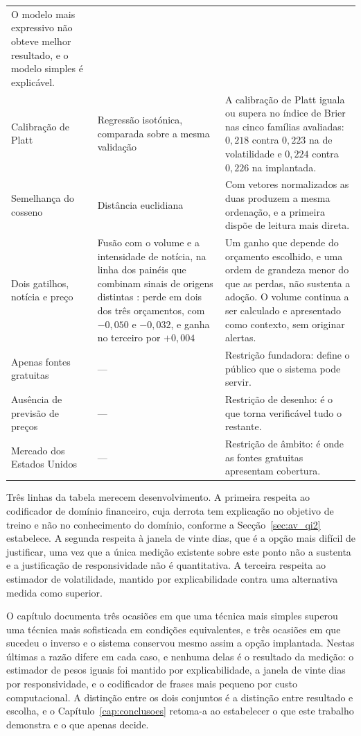 \begin{table}[!htbp]
\begin{tabular}{L{0.19\textwidth} L{0.30\textwidth} L{0.39\textwidth}}
O modelo mais expressivo não obteve melhor resultado, e o modelo simples é explicável. \\
\addlinespace
Calibração de Platt & Regressão isotónica, comparada sobre a mesma validação & A calibração de Platt
iguala ou supera no índice de Brier nas cinco famílias avaliadas: $0{,}218$ contra $0{,}223$ na de
volatilidade e $0{,}224$ contra $0{,}226$ na implantada. \\
\addlinespace
Semelhança do cosseno & Distância euclidiana & Com vetores normalizados as duas produzem a mesma
ordenação, e a primeira dispõe de leitura mais direta. \\
\addlinespace
Dois gatilhos, notícia e preço & Fusão com o volume e a intensidade de notícia, na linha dos painéis
que combinam sinais de origens distintas \autocite{worldmonitor2026}: perde em dois dos três
orçamentos, com $-0{,}050$ e $-0{,}032$, e ganha no terceiro por $+0{,}004$ & Um ganho que depende do
orçamento escolhido, e uma ordem de grandeza menor do que as perdas, não sustenta a adoção. O volume
continua a ser calculado e apresentado como contexto, sem originar alertas. \\
\midrule
Apenas fontes gratuitas & --- & Restrição fundadora: define o público que o sistema pode servir. \\
Ausência de previsão de preços & --- & Restrição de desenho: é o que torna verificável tudo o
restante. \\
Mercado dos Estados Unidos & --- & Restrição de âmbito: é onde as fontes gratuitas apresentam
cobertura. \\
\bottomrule
\end{tabular}
\end{table}

Três linhas da tabela merecem desenvolvimento. A primeira respeita ao codificador de domínio
financeiro, cuja derrota tem explicação no objetivo de treino e não no conhecimento do domínio,
conforme a Secção~\ref{sec:av_qi2} estabelece. A segunda respeita à janela de vinte dias, que é a
opção mais difícil de justificar, uma vez que a única medição existente sobre este ponto não a
sustenta e a justificação de responsividade não é quantitativa. A terceira respeita ao estimador de
volatilidade, mantido por explicabilidade contra uma alternativa medida como superior.

O capítulo documenta três ocasiões em que uma técnica mais simples superou uma técnica mais
sofisticada em condições equivalentes, e três ocasiões em que sucedeu o inverso e o sistema
conservou mesmo assim a opção implantada. Nestas últimas a razão difere em cada caso, e nenhuma
delas é o resultado da medição: o estimador de pesos iguais foi mantido por explicabilidade, a
janela de vinte dias por responsividade, e o codificador de frases mais pequeno por custo
computacional. A distinção entre os dois conjuntos é a distinção entre resultado e escolha, e o
Capítulo~\ref{cap:conclusoes} retoma-a ao estabelecer o que este trabalho demonstra e o
que apenas decide.
